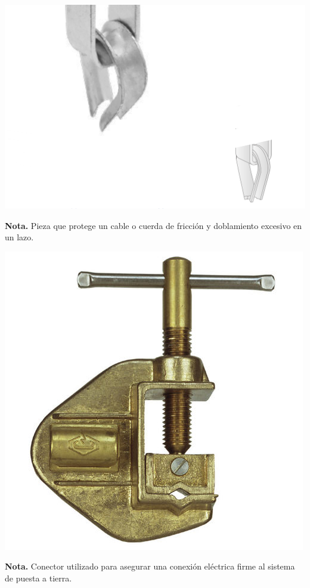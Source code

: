 \vspace{1cm}

\noindent
\begin{minipage}[t]{0.48\textwidth}
    \centering
    \includegraphics[width=\linewidth]{fotosherrajes/guardacables.png}
    \footnotesize
    \raggedright
    \textbf{Nota.} Pieza que protege un cable o cuerda de fricción y doblamiento excesivo en un lazo.
\end{minipage}%
\hfill
\begin{minipage}[t]{0.48\textwidth}
    \centering
    \includegraphics[width=\linewidth]{fotosherrajes/mordaza de conexion a tierra.jpg}
    \footnotesize
    \raggedright
    \textbf{Nota.} Conector utilizado para asegurar una conexión eléctrica firme al sistema de puesta a tierra.
\end{minipage}

